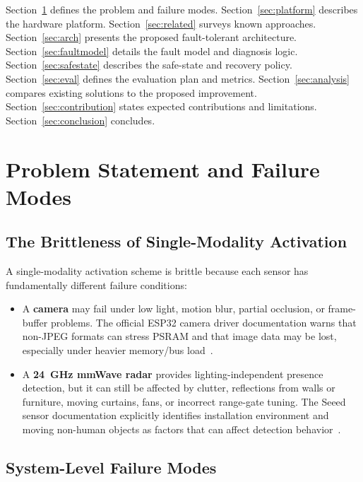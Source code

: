 \documentclass[12pt]{extarticle}
\begin{document}
Section~\ref{sec:problem} defines the problem and failure modes.
Section~\ref{sec:platform} describes the hardware platform.
Section~\ref{sec:related} surveys known approaches.
Section~\ref{sec:arch} presents the proposed fault-tolerant architecture.
Section~\ref{sec:faultmodel} details the fault model and diagnosis logic.
Section~\ref{sec:safestate} describes the safe-state and recovery policy.
Section~\ref{sec:eval} defines the evaluation plan and metrics.
Section~\ref{sec:analysis} compares existing solutions to the proposed improvement.
Section~\ref{sec:contribution} states expected contributions and limitations.
Section~\ref{sec:conclusion} concludes.

\section{Problem Statement and Failure Modes}
\label{sec:problem}

\subsection{The Brittleness of Single-Modality Activation}

A single-modality activation scheme is brittle because each sensor has fundamentally
different failure conditions:

\begin{itemize}
  \item A \textbf{camera} may fail under low light, motion blur, partial occlusion,
        or frame-buffer problems.
        The official ESP32 camera driver documentation warns that non-JPEG formats can
        stress PSRAM and that image data may be lost, especially under heavier
        memory/bus load~\cite{espressif_cam}.
  \item A \textbf{24~GHz mmWave radar} provides lighting-independent presence
        detection, but it can still be affected by clutter, reflections from walls or
        furniture, moving curtains, fans, or incorrect range-gate tuning.
        The Seeed sensor documentation explicitly identifies installation environment
        and moving non-human objects as factors that can affect detection
        behavior~\cite{seeed_mmwave}.
\end{itemize}

\subsection{System-Level Failure Modes}
\end{document}
